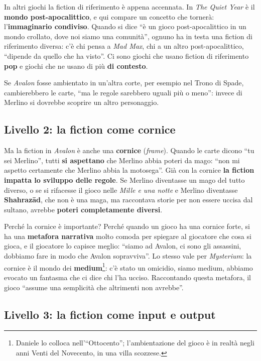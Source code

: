 In altri giochi la fiction di riferimento è appena accennata. In \emph{The Quiet Year} è il
\textbf{mondo post-apocalittico}, e qui compare un concetto che tornerà: l'\textbf{immaginario
condiviso}. Quando si dice ``è un gioco post-apocalittico in un mondo crollato, dove noi siamo una
comunità'', ognuno ha in testa una fiction di riferimento diversa: c'è chi pensa a \emph{Mad Max},
chi a un altro post-apocalittico, ``dipende da quello che ha visto''. Ci sono giochi che usano
fiction di riferimento \textbf{pop} e giochi che ne usano di più \textbf{di contesto}.

Se \emph{Avalon} fosse ambientato in un'altra corte, per esempio nel Trono di Spade,
cambierebbero le carte, ``ma le regole sarebbero uguali più o meno'': invece di Merlino si
dovrebbe scoprire un altro personaggio.

\subsection{Livello 2: la fiction come cornice}

Ma la fiction in \emph{Avalon} è anche una \textbf{cornice} (\emph{frame}). Quando le carte dicono
``tu sei Merlino'', tutti \textbf{si aspettano} che Merlino abbia poteri da mago: ``non mi aspetto
certamente che Merlino abbia la motosega''. Già con la cornice \textbf{la fiction impatta lo
sviluppo delle regole}. Se Merlino diventasse un mago del tutto diverso, o se si rifacesse il gioco
nelle \emph{Mille e una notte} e Merlino diventasse \textbf{Shahrazād}, che non è una maga, ma
raccontava storie per non essere uccisa dal sultano, avrebbe \textbf{poteri completamente diversi}.

Perché la cornice è importante? Perché quando un gioco ha una cornice forte, si ha una
\textbf{metafora narrativa} molto comoda per spiegare al giocatore che cosa si gioca, e il
giocatore lo capisce meglio: ``siamo ad Avalon, ci sono gli assassini, dobbiamo fare in modo che
Avalon sopravviva''. Lo stesso vale per \emph{Mysterium}: la cornice è il mondo dei
\textbf{medium}\footnote{Daniele lo colloca nell'``Ottocento''; l'ambientazione del gioco è in
realtà negli anni Venti del Novecento, in una villa scozzese.}: c'è stato un omicidio, siamo
medium, abbiamo evocato un fantasma che ci dice chi l'ha ucciso. Raccontando questa metafora, il
gioco ``assume una semplicità che altrimenti non avrebbe''.

\subsection{Livello 3: la fiction come input e output}

